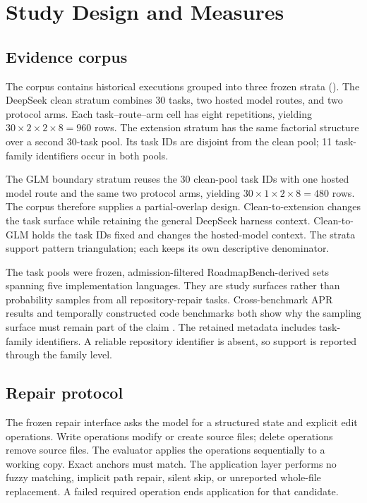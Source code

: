 \section{Study Design and Measures}
\label{sec:study}

\subsection{Evidence corpus}

The corpus contains \TotalRows{} historical executions grouped into three frozen strata (). The DeepSeek clean stratum combines 30 tasks, two hosted model routes, and two protocol arms. Each task--route--arm cell has eight repetitions, yielding $30\times2\times2\times8=960$ rows. The extension stratum has the same factorial structure over a second 30-task pool. Its task IDs are disjoint from the clean pool; 11 task-family identifiers occur in both pools.

The GLM boundary stratum reuses the 30 clean-pool task IDs with one hosted model route and the same two protocol arms, yielding $30\times1\times2\times8=480$ rows. The corpus therefore supplies a partial-overlap design. Clean-to-extension changes the task surface while retaining the general DeepSeek harness context. Clean-to-GLM holds the task IDs fixed and changes the hosted-model context. The strata support pattern triangulation; each keeps its own descriptive denominator.

The task pools were frozen, admission-filtered RoadmapBench-derived sets spanning five implementation languages. They are study surfaces rather than probability samples from all repository-repair tasks. Cross-benchmark APR results and temporally constructed code benchmarks both show why the sampling surface must remain part of the claim \citep{durieux2019repairthemall,jain2025livecodebench}. The retained metadata includes task-family identifiers. A reliable repository identifier is absent, so support is reported through the family level.



\subsection{Repair protocol}

The frozen repair interface asks the model for a structured state and explicit edit operations. Write operations modify or create source files; delete operations remove source files. The evaluator applies the operations sequentially to a working copy. Exact anchors must match. The application layer performs no fuzzy matching, implicit path repair, silent skip, or unreported whole-file replacement. A failed required operation ends application for that candidate.

